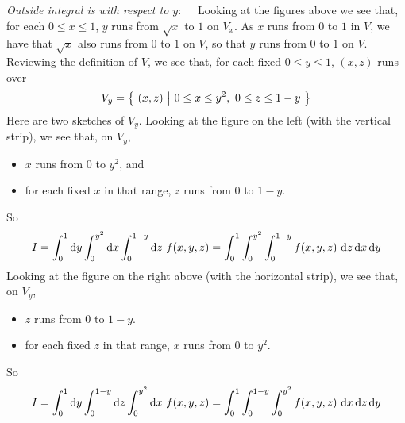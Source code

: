 \begin{solution}
\bigskip
\emph{Outside integral is with respect to $y$}:\ \ \ 
Looking at the figures above we see that, for each $0\le x\le 1$,
$y$ runs from $\sqrt{x}$ to $1$ on $V_x$. As $x$ runs from $0$ to $1$ in $V$, 
we have that $\sqrt{x}$ also runs from $0$ to $1$ on $V$, so that
$y$ runs from $0$ to $1$ on $V$. Reviewing the definition of 
$V$, we see that, for each fixed $0\le y\le 1$, $(x,z)$ runs over
\begin{equation*}
V_y= \Set{(x,z)}{0\le x\le y^2,\ 0\le z\le 1-y}
\end{equation*} 
Here are two sketches of $V_y$.
Looking at the figure on the left (with the vertical strip), we see that, 
on $V_y$,
\begin{itemize}
\item 
$x$ runs from $0$ to $y^2$, and
\item 
for each fixed $x$ in that range,
$z$ runs from $0$ to $1-y$.
\end{itemize}
So
\begin{equation*}
I = \int_0^1 \dee{y} \int_0^{y^2}\dee{x} \int_0^{1-y}\dee{z}\ f(x,y,z)
  = \int_0^1  \int_0^{y^2}\int_0^{1-y}f(x,y,z)\ 
                   \dee{z}\,\dee{x}\, \dee{y}
\end{equation*}
Looking at the figure on the right above (with the horizontal strip), 
we see that, on $V_y$,
\begin{itemize}
\item 
$z$ runs from $0$ to $1-y$.
\item 
for each fixed $z$ in that range,
$x$ runs from $0$ to $y^2$.
\end{itemize}
So
\begin{equation*}
I = \int_0^1 \dee{y} \int_0^{1-y}\dee{z} \int_0^{y^2}\dee{x}\ f(x,y,z)
  = \int_0^1  \int_0^{1-y} \int_0^{y^2} f(x,y,z)\ 
                   \dee{x}\, \dee{z}\,\dee{y}
\end{equation*}
\bigskip



\end{solution}
